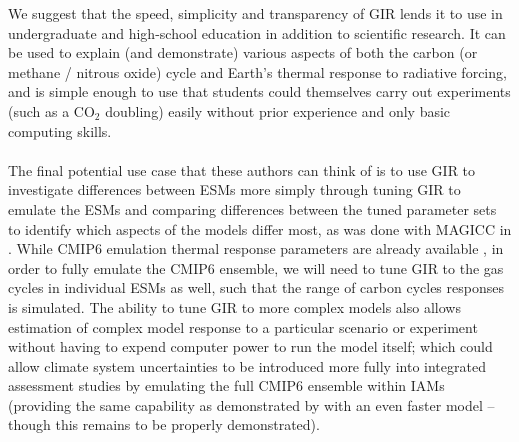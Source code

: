 \documentclass[gmd, manuscript]{copernicus}
\begin{document}
We suggest that the speed, simplicity and transparency of GIR lends it to use in undergraduate and high-school education in addition to scientific research. It can be used to explain (and demonstrate) various aspects of both the carbon (or methane / nitrous oxide) cycle and Earth's thermal response to radiative forcing, and is simple enough to use that students could themselves carry out experiments (such as a CO$_2$ doubling) easily without prior experience and only basic computing skills.\\\\
The final potential use case that these authors can think of is to use GIR to investigate differences between ESMs more simply through tuning GIR to emulate the ESMs and comparing differences between the tuned parameter sets to identify which aspects of the models differ most, as was done with MAGICC in \cite{Meinshausen2011}. While CMIP6 emulation thermal response parameters are already available \citep{Tsutsui2019}, in order to fully emulate the CMIP6 ensemble, we will need to tune GIR to the gas cycles in individual ESMs as well, such that the range of carbon cycles responses is simulated. The ability to tune GIR \citep{Tsutsui2017,Joos2013,Millar2016} to more complex models also allows estimation of complex model response to a particular scenario or experiment without having to expend computer power to run the model itself; which could allow climate system uncertainties to be introduced more fully into integrated assessment studies by emulating the full CMIP6 ensemble within IAMs (providing the same capability as demonstrated by \cite{Meinshausen2011} with an even faster model -- though this remains to be properly demonstrated).\\\\
\end{document}
